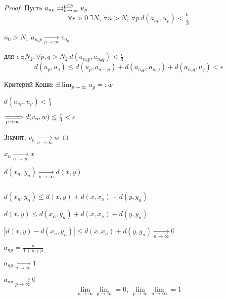     \begin{proof}
        Пусть $a_{np} \rightrightarrows_{n \rightarrow \infty}^{p \in \N} u_p$ 
        \[
            \forall \epsilon > 0 \ \exists N_1 \ \forall n > N_1 \ \forall p \ d(a_{np}, u_p) < \frac{\epsilon}{3}   
        \]
        \par $n_0 > N_1$ \quad $a_{n_0p} \xrightarrow[p \rightarrow \infty]{} v_{n_0}$
        \par для $\epsilon \ \exists N_2 : \forall p, q > N_2 \ d(a_{n_0p}, a_{n_0q}) < \frac{\epsilon}{3}$
        \[
            d(u_p, u_q) \le d(u_p, a_{n-p}) + d(a_{n_0p}, a_{n_0q}) + d(a_{n_0q}, u_q) < \epsilon    
        \]
        \par Критерий Коши: $\exists \lim_{p \rightarrow \infty} u_p =: w$
        \par $d(a_{np}, u_p) < \frac{\epsilon}{3}$
        \par $\xRightarrow[p \rightarrow \infty]{} d(v_n, w) \le \frac{\epsilon}{3} < \epsilon$
        \par Значит, $v_n \xrightarrow[n \rightarrow \infty]{} w$
    \end{proof}

    \begin{remark}
        $x_n \xrightarrow[n \rightarrow \infty]{} x$
        \par $d(x_n, y_n) \xrightarrow[n \rightarrow \infty]{} d(x, y)$
        \par $ $
        \par $d(x_n, y_n) \le d(x, y) + d(x, x_n) + d(y, y_n)$
        \par $d(x, y) \le d(x_n, y_n) + d(x, x_n) + d(y, y_n)$
        \par $|d(x, y) - d(x_n, y_n)| \le d(x, x_n) + d(y, y_n) \xrightarrow[n \rightarrow \infty]{} 0$
    \end{remark}

    \begin{illustration} %
        $a_{np} = \frac{n}{1 + n + p}$
        \par $a_{np} \xrightarrow[n \rightarrow \infty]{} 1$
        \par $a_{np} \xrightarrow[p \rightarrow \infty]{} 0$
        \[
            \lim_{n \rightarrow \infty} \lim_{p \rightarrow \infty} = 0, \ \lim_{p \rightarrow \infty} \lim_{n \rightarrow \infty} = 1    
        \]
    \end{illustration}

